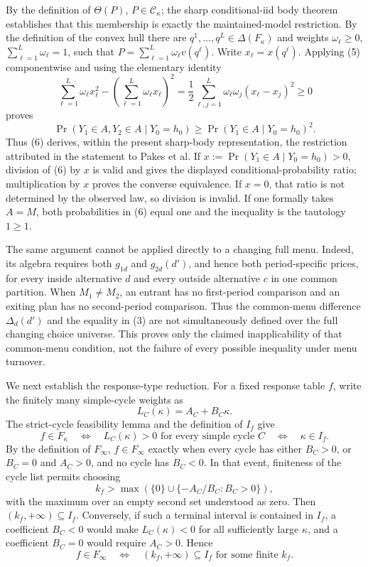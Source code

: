 By the definition of \(\Theta(P)\), \(P\in\mathcal C_\kappa\); the sharp conditional-iid body theorem establishes that this membership is exactly the maintained-model restriction.  By the definition of the convex hull there are \(q^1,\ldots,q^L\in\Delta(F_\kappa)\) and weights \(\omega_\ell\ge0\), \(\sum_{\ell=1}^L\omega_\ell=1\), such that
\(P=\sum_{\ell=1}^L\omega_\ell v(q^\ell)\).  Write \(x_\ell=x(q^\ell)\).  Applying (5) componentwise and using the elementary identity
\[
 \sum_{\ell=1}^L\omega_\ell x_\ell^2-
 \left(\sum_{\ell=1}^L\omega_\ell x_\ell\right)^2
 =\frac12\sum_{\ell,j=1}^L
   \omega_\ell\omega_j(x_\ell-x_j)^2\ge0
\]
proves
\[
 \Pr(Y_1\in A,Y_2\in A\mid Y_0=h_0)
 \ge
 \Pr(Y_1\in A\mid Y_0=h_0)^2.
\tag{6}
\]
Thus (6) derives, within the present sharp-body representation, the restriction attributed in the statement to Pakes et al.  If
\(x:=\Pr(Y_1\in A\mid Y_0=h_0)>0\), division of (6) by \(x\) is valid and gives the displayed conditional-probability ratio; multiplication by \(x\) proves the converse equivalence.  If \(x=0\), that ratio is not determined by the observed law, so division is invalid.  If one formally takes \(A=M\), both probabilities in (6) equal one and the inequality is the tautology \(1\ge1\).

The same argument cannot be applied directly to a changing full menu.  Indeed, its algebra requires both \(g_{1d}\) and \(g_{2d}(d')\), and hence both period-specific prices, for every inside alternative \(d\) and every outside alternative \(c\) in one common partition.  When \(M_1\ne M_2\), an entrant has no first-period comparison and an exiting plan has no second-period comparison.  Thus the common-menu difference \(\Delta_d(d')\) and the equality in (3) are not simultaneously defined over the full changing choice universe.  This proves only the claimed inapplicability of that common-menu condition, not the failure of every possible inequality under menu turnover.

We next establish the response-type reduction.  For a fixed response table \(f\), write the finitely many simple-cycle weights as
\[
 L_C(\kappa)=A_C+B_C\kappa.
\]
The strict-cycle feasibility lemma and the definition of \(I_f\) give
\[
 f\in F_\kappa
 \quad\Longleftrightarrow\quad
 L_C(\kappa)>0\text{ for every simple cycle }C
 \quad\Longleftrightarrow\quad
 \kappa\in I_f.
\tag{7}
\]
By the definition of \(F_\infty\), \(f\in F_\infty\) exactly when every cycle has either \(B_C>0\), or \(B_C=0\) and \(A_C>0\), and no cycle has \(B_C<0\).  In that event, finiteness of the cycle list permits choosing
\[
 k_f>\max\left(\{0\}\cup
 \{-A_C/B_C:B_C>0\}\right),
\]
with the maximum over an empty second set understood as zero.  Then \((k_f,+\infty)\subseteq I_f\).  Conversely, if such a terminal interval is contained in \(I_f\), a coefficient \(B_C<0\) would make \(L_C(\kappa)<0\) for all sufficiently large \(\kappa\), and a coefficient \(B_C=0\) would require \(A_C>0\).  Hence
\[
 f\in F_\infty
 \quad\Longleftrightarrow\quad
 (k_f,+\infty)\subseteq I_f\text{ for some finite }k_f.
\tag{8}
\]

